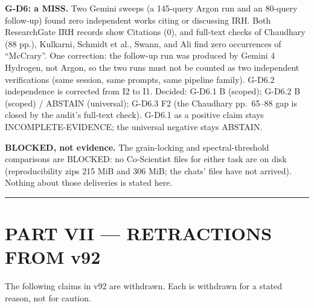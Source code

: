 \documentclass[a4paper,11pt]{article}
\begin{document}
\textbf{G-D6: a MISS.} Two Gemini sweeps (a 145-query Argon run and an 80-query follow-up) found zero independent works citing or discussing IRH. Both ResearchGate IRH records show Citations (0), and full-text checks of Chaudhary (88 pp.), Kulkarni, Schmidt et al., Swann, and Ali find zero occurrences of ``McCrary''. One correction: the follow-up run was produced by Gemini 4 Hydrogen, not Argon, so the two runs must not be counted as two independent verifications (same session, same prompts, same pipeline family). G-D6.2 independence is corrected from I2 to I1. Decided: G-D6.1 B (scoped); G-D6.2 B (scoped) / ABSTAIN (universal); G-D6.3 F2 (the Chaudhary pp.\ 65--88 gap is closed by the audit's full-text check). G-D6.1 as a positive claim stays INCOMPLETE-EVIDENCE; the universal negative stays ABSTAIN.

\textbf{BLOCKED, not evidence.} The grain-locking and spectral-threshold comparisons are BLOCKED: no Co-Scientist files for either task are on disk (reproducibility zips 215 MiB and 306 MiB; the chats' files have not arrived). Nothing about those deliveries is stated here.

\medskip\hrule\medskip

\section*{PART VII — RETRACTIONS FROM v92}

The following claims in v92 are withdrawn. Each is withdrawn for a stated reason, not for caution.
\end{document}
